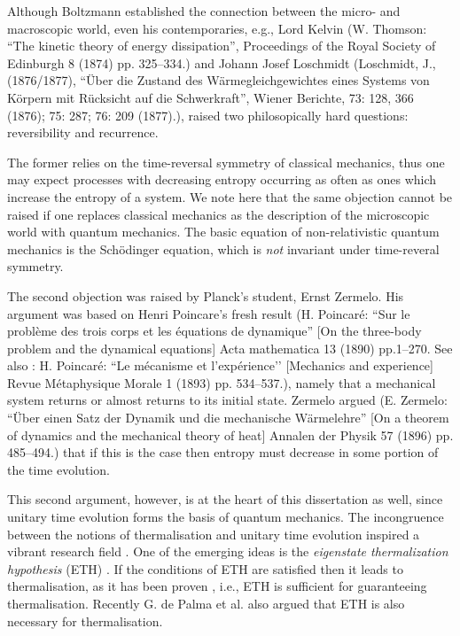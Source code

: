 \documentclass[a4paper, 10pt, draft]{article}
\theoremstyle{plain}
\begin{document}
Although Boltzmann established the connection between the micro- and macroscopic
world, even his contemporaries, e.g., Lord Kelvin (W. Thomson: ``The kinetic
theory of energy dissipation'', Proceedings of the Royal Society of Edinburgh 8
(1874) pp. 325–334.) and Johann Josef Loschmidt (Loschmidt, J., (1876/1877),
``Über die Zustand des Wärmegleichgewichtes eines Systems von Körpern mit
Rücksicht auf die Schwerkraft'', Wiener Berichte, 73: 128, 366 (1876); 75: 287;
76: 209 (1877).), raised two philosopically hard questions: reversibility and
recurrence.

The former relies on the time-reversal symmetry of classical mechanics, thus one
may expect processes with decreasing entropy occurring as often as ones which
increase the entropy of a system. We note here that the same objection cannot be
raised if one replaces classical mechanics as the description of the microscopic
world with quantum mechanics. The basic equation of non-relativistic quantum
mechanics is the Sch{\"o}dinger equation, which is {\emph{not}} invariant under
time-reveral symmetry.

The second objection was raised by Planck's student, Ernst Zermelo. His argument
was based on Henri Poincare's fresh result (H. Poincaré: ``Sur le problème des
trois corps et les équations de dynamique'' [On the three-body problem and the
dynamical equations] Acta mathematica 13 (1890) pp.1–270. See also : H. Poincaré:
``Le mécanisme et l’expérience’’ [Mechanics and experience] Revue Métaphysique
Morale 1 (1893) pp. 534–537.), namely that a mechanical system returns or almost
returns to its initial state. Zermelo argued (E. Zermelo: ``Über einen Satz der
Dynamik und die mechanische Wärmelehre'' [On a theorem of dynamics and the
mechanical theory of heat] Annalen der Physik 57 (1896) pp. 485–494.) that if
this is the case then entropy must decrease in some portion of the time
evolution.

This second argument, however, is at the heart of this dissertation as well,
since unitary time evolution forms the basis of quantum mechanics. The
incongruence between the notions of thermalisation and unitary time evolution
inspired a vibrant research field \cite{Calabrese2006, Cazalilla2006, Rigol2007,
Palma2015}. One of the emerging ideas is the {\emph{eigenstate thermalization
hypothesis}} (ETH) \cite{}. If the conditions of ETH are satisfied then it leads
to thermalisation, as it has been proven \cite{}, i.e., ETH is sufficient for
guaranteeing thermalisation. Recently G. de Palma et al. also argued
\cite{Palma2015} that ETH is also necessary for thermalisation.
\end{document}
